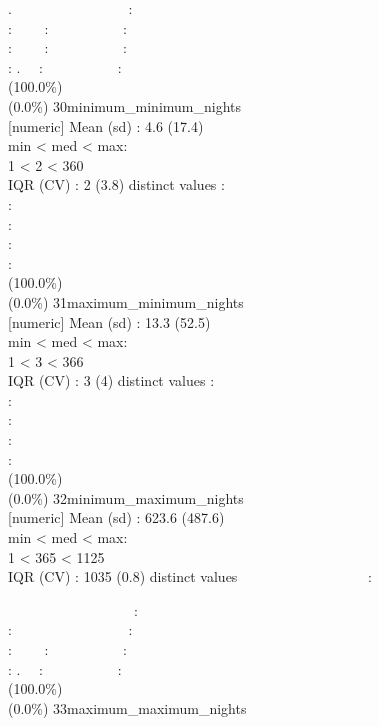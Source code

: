 \documentclass[
  journal,
]{IEEEtran}%
\begin{document}
. ~~~~~~~~~~~~~~~~:\\
: ~~~~: ~~~~~~~~~~:\\
: ~~~~: ~~~~~~~~~~:\\
: . ~~: ~~~~~~~~~~: \\
(100.0\%) \\
(0.0\%) \textbar{} \textbar{} 30\textbar minimum\_minimum\_nights\\
{[}numeric{]} \textbar Mean (sd) : 4.6 (17.4)\\
min \textless{} med \textless{} max:\\
1 \textless{} 2 \textless{} 360\\
IQR (CV) : 2 (3.8)  distinct values \textbar{} \textbar:\\
:\\
:\\
:\\
: \\
(100.0\%) \\
(0.0\%) \textbar{} \textbar{} 31\textbar maximum\_minimum\_nights\\
{[}numeric{]} \textbar Mean (sd) : 13.3 (52.5)\\
min \textless{} med \textless{} max:\\
1 \textless{} 3 \textless{} 366\\
IQR (CV) : 3 (4)  distinct values \textbar{} \textbar:\\
:\\
:\\
:\\
: \\
(100.0\%) \\
(0.0\%) \textbar{} \textbar{} 32\textbar minimum\_maximum\_nights\\
{[}numeric{]} \textbar Mean (sd) : 623.6 (487.6)\\
min \textless{} med \textless{} max:\\
1 \textless{} 365 \textless{} 1125\\
IQR (CV) : 1035 (0.8)  distinct values \textbar{}
\textbar~~~~~~~~~~~~~~~~~~:\\
\strut ~~~~~~~~~~~~~~~~~~:\\
: ~~~~~~~~~~~~~~~~:\\
: ~~~~: ~~~~~~~~~~:\\
: . ~~: ~~~~~~~~~~: \\
(100.0\%) \\
(0.0\%) \textbar{} \textbar{} 33\textbar maximum\_maximum\_nights\\
\end{document}
